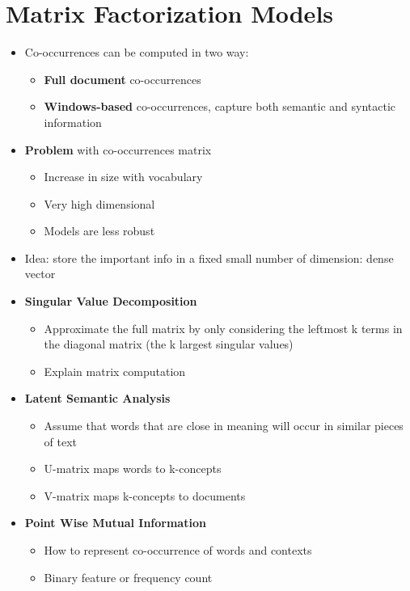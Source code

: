 \section{Matrix Factorization Models}
\begin{itemize}
    \item Co-occurrences can be computed in two way:
    \begin{itemize}
        \item \textbf{Full document} co-occurrences
        \item \textbf{Windows-based} co-occurrences, capture both semantic and syntactic information
    \end{itemize}
    \item \textbf{Problem} with co-occurrences matrix
    \begin{itemize}
        \item Increase in size with vocabulary
        \item Very high dimensional 
        \item Models are less robust
    \end{itemize}
    \item Idea: store the important info in a fixed small number of dimension: dense vector
    \item \textbf{Singular Value Decomposition}
    \begin{itemize}
        \item Approximate the full matrix by only considering the leftmost k terms in the diagonal matrix (the k largest singular values)
        \item Explain matrix computation
    \end{itemize}
    \item \textbf{Latent Semantic Analysis}
    \begin{itemize}
        \item Assume that words that are close in meaning will occur in similar pieces of text
        \item U-matrix maps words to k-concepts
        \item V-matrix maps k-concepts to documents
    \end{itemize}
    \item \textbf{Point Wise Mutual Information}
    \begin{itemize}
        \item How to represent co-occurrence of words and contexts
        \item Binary feature or frequency count

\end{itemize}
\end{itemize}

